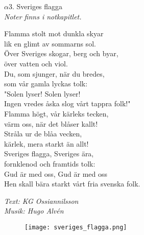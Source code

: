 \documentclass[a6paper,10pt]{article}
\begin{document}
\setlength{\oddsidemargin}{-0.37in}
\begin{center}
\Large $\alpha3$. Sveriges flagga\\
\small\textit{Noter finns i notkapitlet.}
\end{center}
Flamma stolt mot dunkla skyar\\
lik en glimt av sommarns sol.\\
Över Sveriges skogar, berg och byar,\\
över vatten och viol.\\
Du, som sjunger, när du bredes,\\
som vår gamla lyckas tolk:\\
"Solen lyser! Solen lyser!\\
Ingen vredes åska slog vårt tappra folk!"
\vspace{5pt}\\
Flamma högt, vår kärleks tecken,\\
värm oss, när det blåser kallt!\\
Stråla ur de blåa vecken,\\
kärlek, mera starkt än allt!\\
Sveriges flagga, Sveriges ära,\\
fornklenod och framtids tolk:\\
Gud är med oss, Gud är med oss\\
Hen skall bära starkt vårt fria svenska folk. 
\begin{flushright}
\textit{Text: KG Ossiannilsson\\
Musik: Hugo Alvén}
\end{flushright}
\vspace{20pt}
\begin{figure}[!h]
\centering
\texttt{[image: sveriges\_flagga.png]}
\end{figure}
\end{document}
